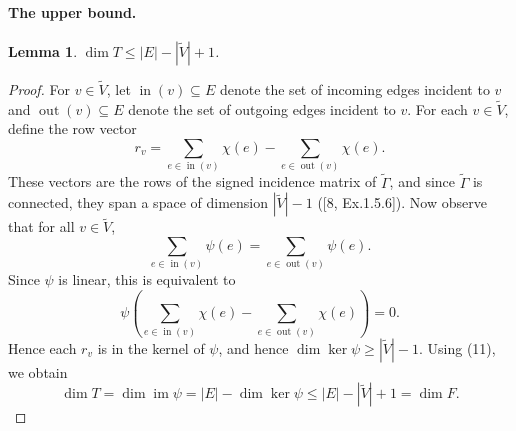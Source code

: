 \documentclass[10pt,a4paper]{article}
\newtheorem{lemma}[theorem]{Lemma}
\DeclareMathOperator{\im}{im}
\DeclareMathOperator{\inset}{in}
\DeclareMathOperator{\outset}{out}
\begin{document}
\paragraph{The upper bound.}
\begin{lemma}$\dim T\le|E|-|\widetilde V|+1$.\end{lemma}
\begin{proof}
For $v\in\widetilde V$, let $\inset(v)\subseteq E$ denote the set of incoming edges incident to $v$ and $\outset(v)\subseteq E$ denote the set of outgoing edges incident to $v$. For each $v\in\widetilde V$, define the row vector
\[r_v=\sum_{e\in\inset(v)}\chi(e)-\sum_{e\in\outset(v)}\chi(e).\]
These vectors are the rows of the signed incidence matrix of $\widetilde\Gamma$, and since $\widetilde\Gamma$ is connected, they span a space of dimension $|\widetilde V|-1$ ([8, Ex.1.5.6]). Now observe that for all $v\in\widetilde V$,
\[\sum_{e\in\inset(v)}\psi(e)=\sum_{e\in\outset(v)}\psi(e).\]
Since $\psi$ is linear, this is equivalent to
\[\psi\left(\sum_{e\in\inset(v)}\chi(e)-\sum_{e\in\outset(v)}\chi(e)\right)=0.\]
Hence each $r_v$ is in the kernel of $\psi$, and hence $\dim\ker\psi\ge|\widetilde V|-1$. Using (11), we obtain
\[\dim T=\dim\im\psi=|E|-\dim\ker\psi\le|E|-|\widetilde V|+1=\dim F.\]
\end{proof}
\end{document}
